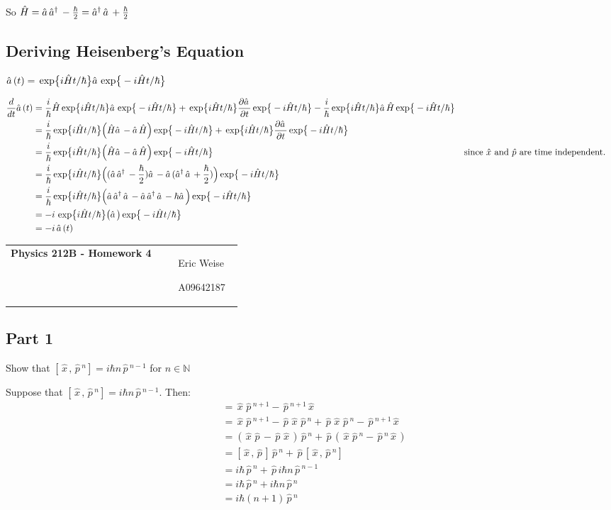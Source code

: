 \documentclass{article}
\newcommand{\assignment}[1]{
    \newpage
    \begin{tabular}{p{0.65\linewidth}p{0.25\linewidth}}
        {\bf\LARGE Physics 212B - Homework #1 }
        &
        \parbox[b]{0.24\textwidth}{
            \hfill Eric Weise

            \hfill A09642187
            }
    \end{tabular}
    \vspace{12pt}
    \newline
}
\renewcommand{\exp}[1]{\,\text{exp} \big\{ #1 \big\} }
\begin{document}
So
\( \hat{H}
    = \hat{a} \,\hat{a}^{\dagger} \, - \frac{\hbar}{2}
    = \hat{a}^{\dagger} \,\hat{a} \, + \frac{\hbar}{2}
\)

\subsection*{Deriving  Heisenberg's Equation}
\( \aop(t) = \exp{i\hat{H}t/\hbar} \aop \exp{-i\hat{H}t/\hbar} \)

\begin{align*}
    \frac{d}{dt} \aop(t)
    &= \frac{i}{\hbar}\hat{H} \exp{i\hat{H}t/\hbar} \aop \exp{-i\hat{H}t/\hbar} +
        \exp{i\hat{H}t/\hbar} \frac{\partial \aop}{\partial t} \exp{-i\hat{H}t/\hbar} - \frac{i}{\hbar} \exp{i\hat{H}t/\hbar} \aop \hat{H} \exp{-i\hat{H}t/\hbar} \\
    &= \frac{i}{\hbar} \exp{i\hat{H}t/\hbar} \Big( \hat{H}\aop - \aop\hat{H} \Big) \exp{-i\hat{H}t/\hbar} +
        \exp{i\hat{H}t/\hbar} \frac{\partial \aop}{\partial t} \exp{-i\hat{H}t/\hbar} \\
    &= \frac{i}{\hbar} \exp{i\hat{H}t/\hbar} \Big( \hat{H}\aop - \aop\hat{H} \Big) \exp{-i\hat{H}t/\hbar}
        && \text{since $\hat{x}$ and $\hat{p}$ are time independent.}\\
    &= \frac{i}{\hbar} \exp{i\hat{H}t/\hbar} \Big((\aop\adagger - \frac{\hbar}{2}) \aop - \aop(\adagger\aop + \frac{\hbar}{2}) \Big) \exp{-i\hat{H}t/\hbar} \\
    &= \frac{i}{\hbar} \exp{i\hat{H}t/\hbar} \Big(\aop\adagger\aop - \aop\adagger\aop - \hbar\aop \Big) \exp{-i\hat{H}t/\hbar} \\
    &= -i \, \exp{i\hat{H}t/\hbar} \big( \aop \big) \exp{-i\hat{H}t/\hbar} \\
    &= -i \, \aop(t)
\end{align*}


\assignment{4}
\newcommand{\xopr}{ \, \hat{x} \,}
\newcommand{\popr}{ \, \hat{p} \,}

\subsection*{Part 1}
Show that
\( [ \xopr, \popr^n ] = i \hbar n \popr^{n-1} \)
for
\( n \in \mathds{N} \)

Suppose that
\( [\xopr,\popr^n] = i\hbar n \popr^{n-1} \).
Then:
\begin{align*}
    [ \xopr, \popr^{n+1} ]
    &= \xopr\popr^{n+1} - \popr^{n+1}\xopr \\
    &= \xopr\popr^{n+1} - \popr\xopr\popr^n + \popr\xopr\popr^n - \popr^{n+1}\xopr \\
    &= (\xopr\popr-\popr\xopr)\popr^n + \popr(\xopr\popr^n - \popr^n\xopr) \\
    &= [\xopr,\popr]\popr^n + \popr[\xopr,\popr^n] \\
    &= i\hbar \popr^n + \popr i\hbar n \popr^{n-1} \\
    &= i\hbar \popr^n + i\hbar n \popr^n \\
    &= i\hbar (n+1) \popr^n
\end{align*}
\end{document}

